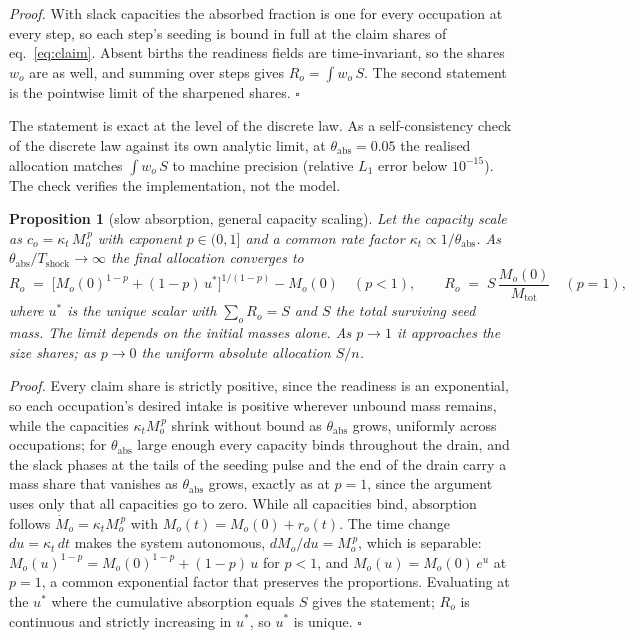\documentclass[12pt, a4paper]{article}
\newtheorem{proposition}{Proposition}
\begin{document}
\noindent\emph{Proof.} With slack capacities the absorbed fraction is one
for every occupation at every step, so each step's seeding is bound in
full at the claim shares of eq.~\eqref{eq:claim}. Absent births the
readiness fields are time-invariant, so the shares $w_o$ are as well, and
summing over steps gives $R_o = \int w_o\, S$. The second statement is
the pointwise limit of the sharpened shares. \hfill$\square$

The statement is exact at the level of the discrete law. As a
self-consistency check of the discrete law against its own analytic
limit, at $\theta_{\text{abs}} = 0.05$ the realised allocation matches
$\int w_o\, S$ to machine precision (relative $L_1$ error below
$10^{-15}$). The check verifies the implementation, not the model.

\begin{proposition}[slow absorption, general capacity scaling]
\label{prop:slow}
Let the capacity scale as $c_o = \kappa_t\,M_o^{\,p}$ with exponent
$p \in (0,1]$ and a common rate factor
$\kappa_t \propto 1/\theta_{\text{abs}}$. As
$\theta_{\text{abs}}/T_{\text{shock}} \to \infty$ the final allocation
converges to
\begin{equation}
R_o \;=\;
\bigl[M_o(0)^{1-p} + (1-p)\,u^*\bigr]^{1/(1-p)} - M_o(0)
\quad (p < 1),
\qquad
R_o \;=\; S\,\frac{M_o(0)}{M_{\text{tot}}}
\quad (p = 1),
\label{eq:slow-general}
\end{equation}
where $u^*$ is the unique scalar with $\sum_o R_o = S$ and $S$ the total
surviving seed mass. The limit depends on the initial masses alone. As
$p \to 1$ it approaches the size shares; as $p \to 0$ the uniform
absolute allocation $S/n$.
\end{proposition}

\noindent\emph{Proof.} Every claim share is strictly positive, since the
readiness is an exponential, so each occupation's desired intake is
positive wherever unbound mass remains, while the capacities
$\kappa_t M_o^{\,p}$ shrink without bound as $\theta_{\text{abs}}$
grows, uniformly across occupations; for $\theta_{\text{abs}}$ large
enough every capacity binds throughout the drain, and the slack phases
at the tails of the seeding pulse and the end of the drain carry a mass
share that vanishes as $\theta_{\text{abs}}$ grows, exactly as at
$p = 1$, since the argument uses only that all capacities go to zero.
While all capacities bind, absorption follows
$\dot M_o = \kappa_t M_o^{\,p}$ with $M_o(t) = M_o(0) + r_o(t)$. The
time change $du = \kappa_t\,dt$ makes the system autonomous,
$dM_o/du = M_o^{\,p}$, which is separable:
$M_o(u)^{1-p} = M_o(0)^{1-p} + (1-p)\,u$ for $p < 1$, and
$M_o(u) = M_o(0)\,e^{u}$ at $p = 1$, a common exponential factor that
preserves the proportions. Evaluating at the $u^*$ where the cumulative
absorption equals $S$ gives the statement; $R_o$ is continuous and
strictly increasing in $u^*$, so $u^*$ is unique. \hfill$\square$
\end{document}
